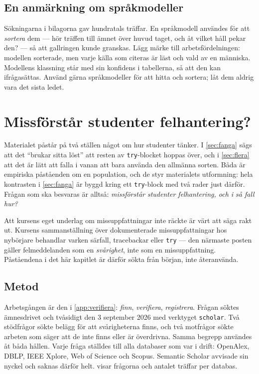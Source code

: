 \section{En anmärkning om språkmodeller}

Sökningarna i bilagorna gav hundratals träffar.  En språkmodell användes
för att \emph{sortera} dem --- hör träffen till ämnet över huvud taget,
och åt vilket håll pekar den? --- så att gallringen kunde granskas.
Lägg märke till arbetsfördelningen: modellen sorterade, men varje källa
som citeras är läst och vald av en människa.  Modellens klassning står
med sin konfidens i tabellerna, så att den kan ifrågasättas.  Använd
gärna språkmodeller för att hitta och sortera; låt dem aldrig vara det
sista ledet.

\chapter{Missförstår studenter felhantering?}
\label{app:nyborjare}

Materialet påstår på två ställen något om hur studenter tänker.  I
\cref{sec:fanga} sägs att det \enquote{brukar sitta löst} att resten av
\texttt{try}-blocket hoppas över, och i \cref{sec:flera} att
det är lätt att falla i vanan att bara använda den allmänna sorten.  Båda
är empiriska påståenden om en population, och de styr materialets
utformning: hela kontrasten i \cref{sec:fanga} är byggd kring ett
\texttt{try}-block med två rader just därför.  Frågan som ska
besvaras är alltså: \emph{missförstår studenter felhantering, och i så
fall hur?}

Att kursens eget underlag om missuppfattningar inte räckte är värt att
säga rakt ut.  Kursens sammanställning över dokumenterade
missuppfattningar hos nybörjare behandlar varken särfall, tracebackar
eller \texttt{try} --- den närmaste posten gäller
felmeddelanden som en \emph{svårighet}, inte som en missuppfattning.
Påståendena i det här kapitlet är därför sökta från början, inte
återanvända.

\section{Metod}
\label{sec:nyb-metod}

Arbetsgången är den i \cref{app:verifiera}: \emph{finn}, \emph{verifiera},
\emph{registrera}.  Frågan söktes ämnesdrivet och tvåsidigt den 3
september 2026 med verktyget \texttt{scholar}.  Två stödfrågor sökte
belägg för att svårigheterna finns, och två motfrågor sökte arbeten som
säger att de inte finns eller är överdrivna.  Samma begrepp användes åt
båda hållen.  Varje fråga ställdes till alla databaser som var i drift:
OpenAlex, DBLP, IEEE Xplore, Web of Science och Scopus.  Semantic
Scholar avvisade sin nyckel och saknas därför helt.
 visar frågorna och antalet träffar per databas.

